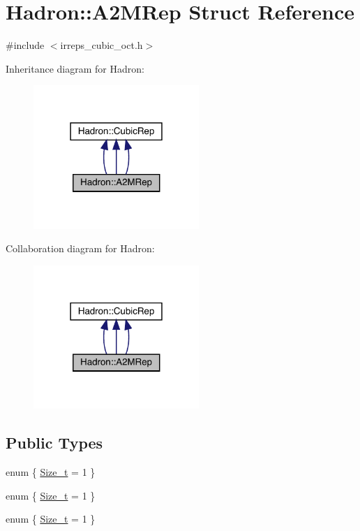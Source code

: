 \hypertarget{structHadron_1_1A2MRep}{}\section{Hadron\+:\+:A2\+M\+Rep Struct Reference}
\label{structHadron_1_1A2MRep}


{\ttfamily \#include $<$irreps\+\_\+cubic\+\_\+oct.\+h$>$}



Inheritance diagram for Hadron\+:
\nopagebreak
\begin{figure}[H]
\begin{center}
\leavevmode
\includegraphics[width=178pt]{d5/dac/structHadron_1_1A2MRep__inherit__graph}
\end{center}
\end{figure}


Collaboration diagram for Hadron\+:
\nopagebreak
\begin{figure}[H]
\begin{center}
\leavevmode
\includegraphics[width=178pt]{dc/dc6/structHadron_1_1A2MRep__coll__graph}
\end{center}
\end{figure}
\subsection*{Public Types}
\begin{DoxyCompactItemize}
\item 
enum \{ \mbox{\hyperlink{structHadron_1_1A2MRep_a1817133afbded9c666aeeaf249ad57eba7b3ea5f88e442ca6fa38c52bc3f32169}{Size\+\_\+t}} = 1
 \}
\item 
enum \{ \mbox{\hyperlink{structHadron_1_1A2MRep_a1817133afbded9c666aeeaf249ad57eba7b3ea5f88e442ca6fa38c52bc3f32169}{Size\+\_\+t}} = 1
 \}
\item 
enum \{ \mbox{\hyperlink{structHadron_1_1A2MRep_a1817133afbded9c666aeeaf249ad57eba7b3ea5f88e442ca6fa38c52bc3f32169}{Size\+\_\+t}} = 1
 \}
\end{DoxyCompactItemize}
